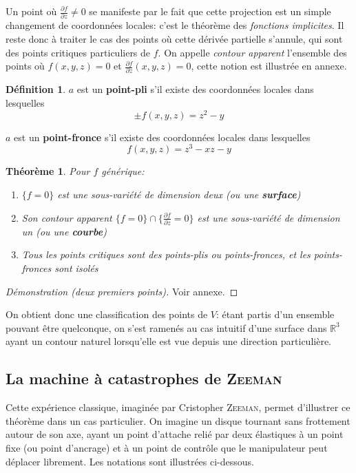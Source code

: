 \documentclass{article}
\newcommand{\R}{\mathbb{R}}
\newtheorem{thm}{Théorème}
\theoremstyle{definition}
\newtheorem{defn}{Définition}
\begin{document}
Un point où $\frac{\partial f}{\partial z}\neq 0$ se manifeste par le fait que cette projection est un simple changement de coordonnées locales: c'est le théorème des \textit{fonctions implicites}.
Il reste donc à traiter le cas des points où cette dérivée partielle s'annule, qui sont des points critiques particuliers de $f$.
On appelle \textit{contour apparent} l'ensemble des points où $f(x,y,z)=0$ et $\frac{\partial f}{\partial z}(x,y,z)=0$, cette notion est illustrée en annexe.
\begin{defn}
	$a$ est un \textbf{point-pli} s'il existe des coordonnées locales dans lesquelles
	$$\pm f(x, y, z) = z^2 - y$$

	$a$ est un \textbf{point-fronce} s'il existe des coordonnées locales dans lesquelles
	$$f(x,y,z) = z^3 - xz - y$$
\end{defn}
\begin{thm}
	Pour $f$ générique:
	\begin{enumerate}
		\item $\{f=0\}$ est une sous-variété de dimension deux (ou une \textbf{surface})
		\item Son contour apparent $\{f=0\}\cap \{\frac{\partial f}{\partial z}=0\}$ est une sous-variété de dimension un (ou une \textbf{courbe})
		\item Tous les points critiques sont des points-plis ou points-fronces, et les points-fronces sont isolés
	\end{enumerate}
\end{thm}
\begin{proof}[Démonstration (deux premiers points)] Voir annexe. \end{proof}

On obtient donc une classification des points de $V$: étant partis d'un ensemble pouvant être quelconque, on s'est ramenés au cas intuitif d'une surface dans $\R^3$ ayant un contour naturel lorsqu'elle est vue depuis une direction particulière.

\subsection{La machine à catastrophes de \textsc{Zeeman}}
Cette expérience classique, imaginée par Cristopher \textsc{Zeeman}, permet d'illustrer ce théorème dans un cas particulier.
On imagine un disque tournant sans frottement autour de son axe, ayant un point d'attache relié par deux élastiques à un point fixe (ou point d'ancrage) et à un point de contrôle que le manipulateur peut déplacer librement.
Les notations sont illustrées ci-dessous.
\end{document}
